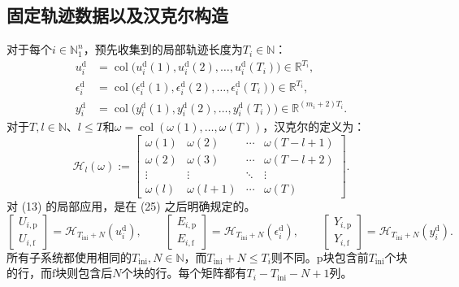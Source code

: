 \documentclass{article}
\begin{document}
\subsection*{固定轨迹数据以及汉克尔构造}
对于每个$i\in\mathbb N_1^n$，预先收集到的局部轨迹长度为$T_i\in\mathbb N$：
\begin{align}
u_i^{\mathrm d}&=\operatorname{col}\bigl(u_i^{\mathrm d}(1),u_i^{\mathrm d}(2),\ldots,u_i^{\mathrm d}(T_i)\bigr)\in\mathbb R^{T_i}, \tag{25a}\\
\epsilon_i^{\mathrm d}&=\operatorname{col}\bigl(\epsilon_i^{\mathrm d}(1),\epsilon_i^{\mathrm d}(2),\ldots,\epsilon_i^{\mathrm d}(T_i)\bigr)\in\mathbb R^{T_i}, \tag{25b}\\
y_i^{\mathrm d}&=\operatorname{col}\bigl(y_i^{\mathrm d}(1),y_i^{\mathrm d}(2),\ldots,y_i^{\mathrm d}(T_i)\bigr)\in\mathbb R^{(m_i+2)T_i}. \tag{25c}
\end{align}
对于$T,l\in\mathbb N$、$l\leq T$和$\omega=\operatorname{col}(\omega(1),\ldots,\omega(T))$，汉克尔的定义为：
\begin{equation}
\mathcal H_l(\omega):=
\begin{bmatrix}
\omega(1)&\omega(2)&\cdots&\omega(T-l+1)\\
\omega(2)&\omega(3)&\cdots&\omega(T-l+2)\\
\vdots&\vdots&\ddots&\vdots\\
\omega(l)&\omega(l+1)&\cdots&\omega(T)
\end{bmatrix}. \tag{11}
\end{equation}
对 (13) 的局部应用，是在 (25) 之后明确规定的。
\[
\begin{bmatrix}U_{i,\mathrm p}\\U_{i,\mathrm f}\end{bmatrix}
=\mathcal H_{T_{\mathrm{ini}}+N}(u_i^{\mathrm d}),\qquad
\begin{bmatrix}E_{i,\mathrm p}\\E_{i,\mathrm f}\end{bmatrix}
=\mathcal H_{T_{\mathrm{ini}}+N}(\epsilon_i^{\mathrm d}),\qquad
\begin{bmatrix}Y_{i,\mathrm p}\\Y_{i,\mathrm f}\end{bmatrix}
=\mathcal H_{T_{\mathrm{ini}}+N}(y_i^{\mathrm d}).
\]
所有子系统都使用相同的$T_{\mathrm{ini}},N\in\mathbb N$，而$T_{\mathrm{ini}}+N\leq T_i$则不同。$\mathrm p$块包含前$T_{\mathrm{ini}}$个块的行，而$\mathrm f$块则包含后$N$个块的行。每个矩阵都有$T_i-T_{\mathrm{ini}}-N+1$列。
\end{document}
